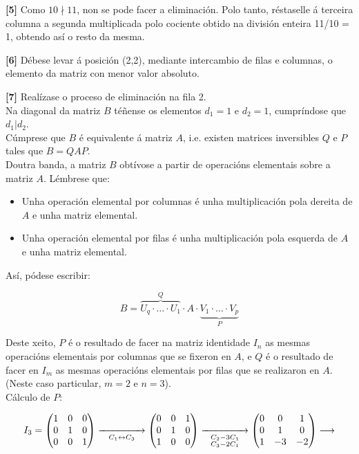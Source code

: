 \documentclass[twoside]{report}
\theoremstyle{mystyle}
\begin{document}
\noindent \textbf{[5]} Como $10 \nmid 11$, non se pode facer a eliminación. Polo tanto, réstaselle á terceira columna a segunda multiplicada polo cociente obtido na división enteira 11/10 = 1, obtendo así o resto da mesma.

\noindent \textbf{[6]} Débese levar á posición (2,2), mediante intercambio de filas e columnas, o elemento da matriz con menor valor absoluto.

\noindent \textbf{[7]} Realízase o proceso de eliminación na fila 2.\\

\noindent Na diagonal da matriz $B$ téñense os elementos $d_{1} = 1$ e $d_{2} = 1$, cumpríndose que $d_{1} | d_{2}$.\\

\noindent Cúmprese que $B$ é equivalente á matriz $A$, i.e. existen matrices inversibles $Q$ e $P$ tales que $B = QAP$.\\

\noindent Doutra banda, a matriz $B$ obtívose a partir de operacións elementais sobre a matriz $A$. Lémbrese que:

\begin{itemize}
    \item Unha operación elemental por columnas é unha multiplicación pola dereita de $A$ e unha matriz elemental.
    \item Unha operación elemental por filas é unha multiplicación pola esquerda de $A$ e unha matriz elemental.
\end{itemize}

\noindent Así, pódese escribir:

$$B = \overbrace{U_{q} \cdot \dots \cdot U_{1}}^{Q} \cdot A \cdot \underbrace{V_{1} \cdot \dots \cdot V_{p}}_{P}$$

\noindent Deste xeito, $P$ é o resultado de facer na matriz identidade $I_{n}$ as mesmas operacións elementais por columnas que se fixeron en $A$, e $Q$ é o resultado de facer en $I_{m}$ as mesmas operacións elementais por filas que se realizaron en $A$. (Neste caso particular, $m = 2$ e $n = 3$).\\

\noindent Cálculo de $P$:

$$
I_{3} = \begin{pmatrix}
1 & 0 & 0\\
0 & 1 & 0\\
0 & 0 & 1
\end{pmatrix}
\underset{C_{1} \leftrightarrow C_{3}}{\xrightarrow{\hspace{15mm}}}
\begin{pmatrix}
0 & 0 & 1\\
0 & 1 & 0\\
1 & 0 & 0
\end{pmatrix}
\underset{\substack{C_{2} - 3C_{1} \\ C_{3} - 2C_{1}}}{\xrightarrow{\hspace{15mm}}}
\begin{pmatrix}
0 & 0 & 1\\
0 & 1 & 0\\
1 & -3 & -2
\end{pmatrix}
\longrightarrow
$$
\end{document}
